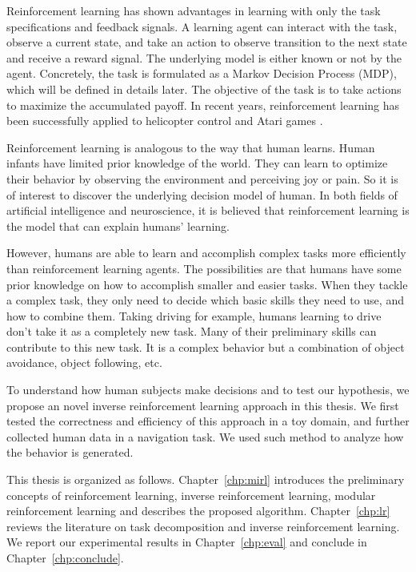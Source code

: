 Reinforcement learning has shown advantages in learning with only the task
specifications and feedback signals. A learning agent can interact with the
task, observe a current state, and take an action to observe
transition to the next state and receive a reward signal. The underlying model is either
known or not by the agent. Concretely, the task is formulated as a
Markov Decision Process (MDP), which will be defined in details later.
The objective of the task is to take actions to maximize the accumulated payoff.
In recent years, reinforcement learning has been successfully applied to
helicopter control \cite{ng2006autonomous} and Atari games \cite{mnih2013playing}.

Reinforcement learning is analogous to the way that human learns. Human infants
have limited prior knowledge of the world. They can learn to optimize
their behavior by observing the environment and perceiving joy or pain. So it is
of interest to discover the underlying decision model of human. In both fields
of artificial intelligence and neuroscience, it is believed that reinforcement
learning is the model that can explain humans' learning.

However, humans are able to learn and accomplish complex tasks more efficiently than
reinforcement learning agents. The possibilities are that humans have some prior
knowledge on how to accomplish smaller and easier tasks. When they tackle a
complex task, they only need to decide which basic skills they need to use, and
how to combine them. Taking driving for example, humans learning to drive don't
take it as a completely new task. Many of their preliminary skills can
contribute to this new task. It is a complex behavior but a combination of
object avoidance, object following, etc.

To understand how human subjects make decisions and to test our hypothesis, we
propose an novel inverse reinforcement learning approach in this thesis.
We first tested the correctness and efficiency of this approach in a toy domain,
and further collected human data in a navigation task. We used such method
to analyze how the behavior is generated.

This thesis is organized as follows. Chapter~\ref{chp:mirl} introduces the
preliminary concepts of reinforcement learning, inverse reinforcement learning,
modular reinforcement learning and describes the proposed algorithm.
Chapter~\ref{chp:lr} reviews the literature on task decomposition and inverse
reinforcement learning. We report our experimental results in
Chapter~\ref{chp:eval} and conclude in Chapter~\ref{chp:conclude}.
